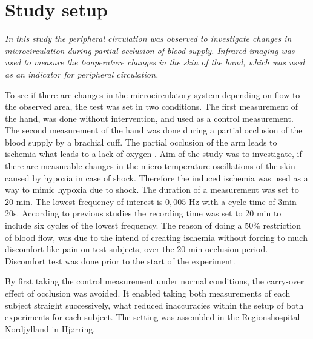 \chapter{Study setup}

\textit{In this study the peripheral circulation was observed to investigate changes in microcirculation during partial occlusion of blood supply. Infrared imaging was used to measure the temperature changes in the skin of the hand, which was used as an indicator for peripheral circulation.} 


To see if there are changes in the microcirculatory system depending on flow to the observed area, the test was set in two conditions. The first measurement of the hand, was done without intervention, and used as a control measurement. The second measurement of the hand was done during a partial occlusion of the blood supply by a brachial cuff. The partial occlusion of the arm leads to ischemia what leads to a lack of oxygen \cite{martini2012}. Aim of the study was to investigate, if there are measurable changes in the micro temperature oscillations of the skin caused by hypoxia in case of shock. Therefore the induced ischemia was used as a way to mimic hypoxia due to shock.
The duration of a measurement was set to 20 min. The lowest frequency of interest is $0,005$ Hz with a cycle time of 3min 20s. \cite{sagaidachnyi2014} According to previous studies the recording time was set to 20 min to include six cycles of the lowest frequency.
The reason of doing a 50\% restriction of blood flow, was due to the intend of creating ischemia without forcing to much discomfort like pain on test subjects, over the 20 min occlusion period. Discomfort test was done prior to the start of the experiment.

By first taking the control measurement under normal conditions, the carry-over effect of occlusion was avoided. It enabled taking both measurements of each subject straight successively, what reduced inaccuracies within the setup of both experiments for each subject. The setting was assembled in the Regionshospital Nordjylland in Hj\o{}rring.